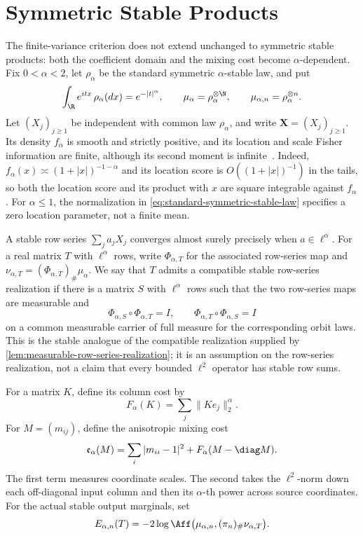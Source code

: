 \section{Symmetric Stable Products}
\label{sec:symmetric-stable-products-and-anisotropic-geometry}

The finite-variance criterion does not extend unchanged to symmetric stable
products: both the coefficient domain and the mixing cost become
\(\alpha\)-dependent.
Fix \(0<\alpha<2\), let \(\rho_\alpha\) be the standard symmetric
\(\alpha\)-stable law, and put
\begin{equation}
 \int_\R e^{itx}\,\rho_\alpha(dx)=e^{-|t|^\alpha},
 \qquad
 \mu_\alpha=\rho_\alpha^{\otimes\N},
 \qquad
 \mu_{\alpha,n}=\rho_\alpha^{\otimes n}.
 \label{eq:standard-symmetric-stable-law}
\end{equation}
Let \((X_j)_{j\geq1}\) be independent with common law \(\rho_\alpha\), and
write \(\mathbf X=(X_j)_{j\geq1}\).
Its density \(f_\alpha\) is smooth and strictly positive, and its location
and scale Fisher information are finite, although its second moment is
infinite~\cite{bobkov2014stable}.
Indeed, \(f_\alpha(x)\asymp(1+|x|)^{-1-\alpha}\) and its location score is
\(O((1+|x|)^{-1})\) in the tails, so both the location score and its product
with \(x\) are square integrable against \(f_\alpha\).
For \(\alpha\le1\), the normalization in
\eqref{eq:standard-symmetric-stable-law} specifies a zero location parameter,
not a finite mean.

A stable row series \(\sum_ja_jX_j\) converges almost surely precisely when
\(a\in\ell^\alpha\).
For a real matrix \(T\) with \(\ell^\alpha\) rows, write
\(\Phi_{\alpha,T}\) for the associated row-series map and
\(\nu_{\alpha,T}=(\Phi_{\alpha,T})_\#\mu_\alpha\).
We say that \(T\) admits a compatible stable row-series realization if
there is a matrix \(S\)
with \(\ell^\alpha\) rows such that the two row-series maps are measurable
and
\[
 \Phi_{\alpha,S}\circ\Phi_{\alpha,T}=I,
 \qquad
 \Phi_{\alpha,T}\circ\Phi_{\alpha,S}=I
\]
on a common measurable carrier of full measure for the corresponding orbit
laws.
This is the stable analogue of the compatible realization supplied by
\cref{lem:measurable-row-series-realization}; it is an assumption on the
row-series realization, not a claim that every bounded \(\ell^2\) operator has
stable row sums.

For a matrix \(K\), define its column cost by
\[
 F_\alpha(K)=\sum_j\|Ke_j\|_2^\alpha.
\]
For \(M=(m_{ij})\), define the anisotropic mixing cost
\begin{equation}
 \mathfrak e_\alpha(M)
 =\sum_i|m_{ii}-1|^2
  +F_\alpha(M-\diag M).
 \label{eq:stable-mixing-cost}
\end{equation}
The first term measures coordinate scales.
The second takes the \(\ell^2\)-norm down each off-diagonal input
column and then its \(\alpha\)-th power across source coordinates.
For the actual stable output marginals, set
\begin{equation}
 E_{\alpha,n}(T)
 =-2\log\Aff\bigl(
       \mu_{\alpha,n},(\pi_n)_\#\nu_{\alpha,T}\bigr).
 \label{eq:stable-projected-hellinger-energy}
\end{equation}

